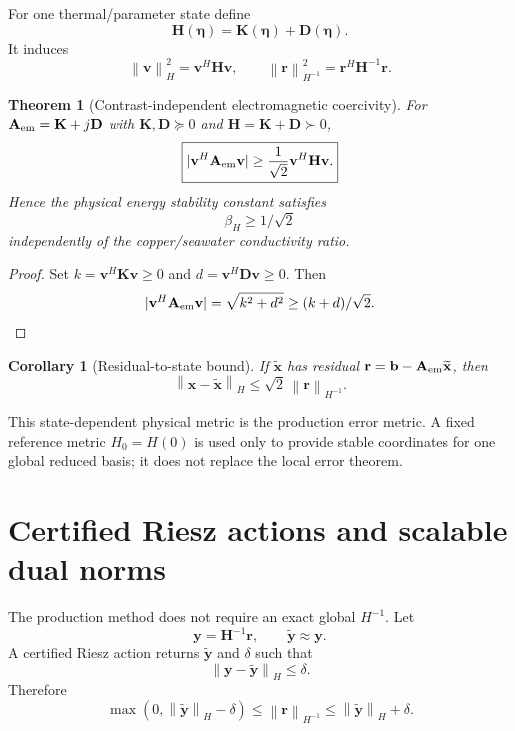 \documentclass[11pt]{article}
\newtheorem{theorem}[assumption]{Theorem}
\newtheorem{corollary}[assumption]{Corollary}
\theoremstyle{remark}
\newcommand{\etaPar}{\boldsymbol\eta}
\newcommand{\norm}[1]{\left\lVert #1\right\rVert}
\begin{document}
For one thermal/parameter state define
\begin{equation}
\boxed{
\mathbf H(\etaPar)=\mathbf K(\etaPar)+\mathbf D(\etaPar).
}
\label{eq:physical_H}
\end{equation}
It induces
\[
\norm{\mathbf v}_{H}^2=\mathbf v^H\mathbf H\mathbf v,
\qquad
\norm{\mathbf r}_{H^{-1}}^2=\mathbf r^H\mathbf H^{-1}\mathbf r.
\]

\begin{theorem}[Contrast-independent electromagnetic coercivity]
For \(\mathbf A_{\rm em}=\mathbf K+j\mathbf D\) with \(\mathbf K,\mathbf D\succeq0\) and \(\mathbf H=\mathbf K+\mathbf D\succ0\),
\begin{equation}
\boxed{
|\mathbf v^H\mathbf A_{\rm em}\mathbf v|
\ge\frac1{\sqrt2}\mathbf v^H\mathbf H\mathbf v.
}
\label{eq:energy_coercivity}
\end{equation}
Hence the physical energy stability constant satisfies
\[
\boxed{\beta_H\ge1/\sqrt2}
\]
independently of the copper/seawater conductivity ratio.
\end{theorem}
\begin{proof}
Set \(k=\mathbf v^H\mathbf K\mathbf v\ge0\) and \(d=\mathbf v^H\mathbf D\mathbf v\ge0\). Then
\[
|\mathbf v^H\mathbf A_{\rm em}\mathbf v|=\sqrt{k^2+d^2}
\ge(k+d)/\sqrt2.
\]
\end{proof}

\begin{corollary}[Residual-to-state bound]
If \(\widetilde{\mathbf x}\) has residual \(\mathbf r=\mathbf b-\mathbf A_{\rm em}\widetilde{\mathbf x}\), then
\begin{equation}
\boxed{
\norm{\mathbf x-\widetilde{\mathbf x}}_H
\le\sqrt2\,\norm{\mathbf r}_{H^{-1}}.
}
\label{eq:residual_state_bound}
\end{equation}
\end{corollary}

This state-dependent physical metric is the production error metric. A fixed reference metric \(H_0=H(0)\) is used only to provide stable coordinates for one global reduced basis; it does not replace the local error theorem.

\section{Certified Riesz actions and scalable dual norms}

The production method does not require an exact global \(H^{-1}\). Let
\[
\mathbf y=\mathbf H^{-1}\mathbf r,
\qquad
\widetilde{\mathbf y}\approx\mathbf y.
\]
A certified Riesz action returns \(\widetilde{\mathbf y}\) and \(\delta\) such that
\begin{equation}
\boxed{
\norm{\mathbf y-\widetilde{\mathbf y}}_H\le\delta.
}
\label{eq:riesz_action_error}
\end{equation}
Therefore
\begin{equation}
\boxed{
\max(0,\norm{\widetilde{\mathbf y}}_H-\delta)
\le\norm{\mathbf r}_{H^{-1}}
\le\norm{\widetilde{\mathbf y}}_H+\delta.
}
\label{eq:dual_interval}
\end{equation}
\end{document}
